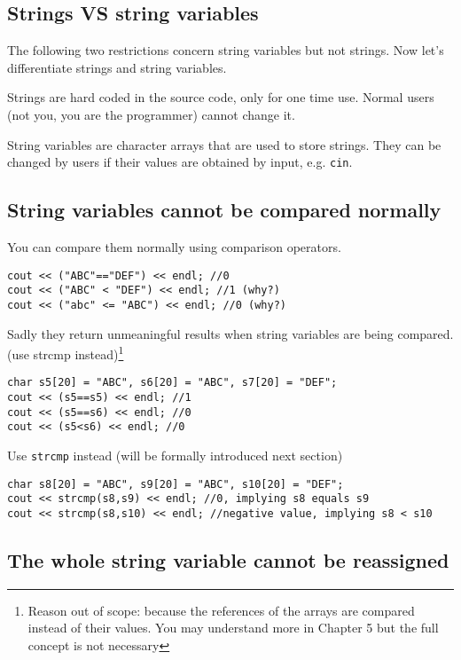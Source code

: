 \subsection{Strings VS string variables}

The following two restrictions concern string variables but not strings. Now let's differentiate strings and string variables.
\vspace{6mm}

Strings are hard coded in the source code, only for one time use. Normal users (not you, you are the programmer) cannot change it.

String variables are character arrays that are used to store strings. They can be changed by users if their values are obtained by input, e.g. \texttt{cin}. 

\subsection*{String variables cannot be compared normally}

You can compare them normally using comparison operators.

\begin{lstlisting}
cout << ("ABC"=="DEF") << endl; //0
cout << ("ABC" < "DEF") << endl; //1 (why?)
cout << ("abc" <= "ABC") << endl; //0 (why?)
\end{lstlisting}

Sadly they return unmeaningful results when string variables are being compared. (use strcmp instead)\footnote{Reason out of scope: because the references of the arrays are compared instead of their values. You may understand more in Chapter 5 but the full concept is not necessary}

\begin{lstlisting}
char s5[20] = "ABC", s6[20] = "ABC", s7[20] = "DEF";
cout << (s5==s5) << endl; //1
cout << (s5==s6) << endl; //0
cout << (s5<s6) << endl; //0
\end{lstlisting}

Use \texttt{strcmp} instead (will be formally introduced next section)
\begin{lstlisting}
char s8[20] = "ABC", s9[20] = "ABC", s10[20] = "DEF";
cout << strcmp(s8,s9) << endl; //0, implying s8 equals s9
cout << strcmp(s8,s10) << endl; //negative value, implying s8 < s10
\end{lstlisting}

\subsection*{The whole string variable cannot be reassigned}

